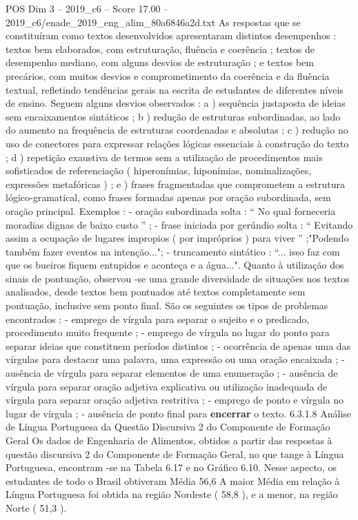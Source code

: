 \begin{textsample}{POS Dim 3 – 2019\_c6 – Score 17.00 – 2019\_c6/enade\_2019\_eng\_alim\_80a6846a2d.txt}
As respostas que se constituíram como textos desenvolvidos apresentaram distintos desempenhos : textos bem elaborados, com estruturação, fluência e coerência ; textos de desempenho mediano, com alguns desvios de estruturação ; e textos bem precários, com muitos desvios e comprometimento da coerência e da fluência textual, refletindo tendências gerais na escrita de estudantes de diferentes níveis de ensino.
Seguem alguns desvios observados : a ) sequência justaposta de ideias sem encaixamentos sintáticos ; b ) redução de estruturas subordinadas, ao lado do aumento na frequência de estruturas coordenadas e absolutas ; c ) redução no uso de conectores para expressar relações lógicas essenciais à construção do texto ; d ) repetição exaustiva de termos sem a utilização de procedimentos mais sofisticados de referenciação ( hiperonímias, hiponímias, nominalizações, expressões metafóricas ) ; e ) frases fragmentadas que comprometem a estrutura lógico-gramatical, como frases formadas apenas por oração subordinada, sem oração principal.
Exemplos : - oração subordinada solta : “ No qual forneceria moradias dignas de baixo custo ” ; - frase iniciada por gerúndio solta : “ Evitando assim a ocupação de lugares impropios ( por impróprios ) para viver ” ;"Podendo também fazer eventos na intenção..."; - truncamento sintático : “... isso faz com que os bueiros fiquem entupidos e aconteça e a água...".
Quanto à utilização dos sinais de pontuação, observou -se uma grande diversidade de situações nos textos analisados, desde textos bem pontuados até textos completamente sem pontuação, inclusive sem ponto final.
São os seguintes os tipos de problemas encontrados : - emprego de vírgula para separar o sujeito e o predicado, procedimento muito frequente ; - emprego de vírgula no lugar do ponto para separar ideias que constituem períodos distintos ; - ocorrência de apenas uma das vírgulas para destacar uma palavra, uma expressão ou uma oração encaixada ; - ausência de vírgula para separar elementos de uma enumeração ; - ausência de vírgula para separar oração adjetiva explicativa ou utilização inadequada de vírgula para separar oração adjetiva restritiva ; - emprego de ponto e vírgula no lugar de vírgula ; - ausência de ponto final para \textbf{encerrar} o texto. 6.3.1.8 Análise de Língua Portuguesa da Questão Discursiva 2 do Componente de Formação Geral Os dados de Engenharia de Alimentos, obtidos a partir das respostas à questão discursiva 2 do Componente de Formação Geral, no que tange à Língua Portuguesa, encontram -se na Tabela 6.17 e no Gráfico 6.10.
Nesse aspecto, os estudantes de todo o Brasil obtiveram Média 56,6 A maior Média em relação à Língua Portuguesa foi obtida na região Nordeste ( 58,8 ), e a menor, na região Norte ( 51,3 ).

\end{textsample}
